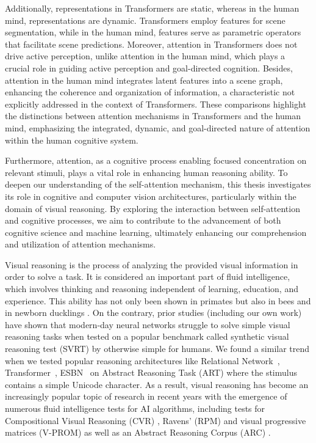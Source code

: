 Additionally, representations in Transformers are static, whereas in the human mind, representations are dynamic. Transformers employ features for scene segmentation, while in the human mind, features serve as parametric operators that facilitate scene predictions. Moreover, attention in Transformers does not drive active perception, unlike attention in the human mind, which plays a crucial role in guiding active perception and goal-directed cognition. Besides, attention in the human mind integrates latent features into a scene graph, enhancing the coherence and organization of information, a characteristic not explicitly addressed in the context of Transformers. These comparisons highlight the distinctions between attention mechanisms in Transformers and the human mind, emphasizing the integrated, dynamic, and goal-directed nature of attention within the human cognitive system.

Furthermore, attention, as a cognitive process enabling focused concentration on relevant stimuli, plays a vital role in enhancing human reasoning ability. To deepen our understanding of the self-attention mechanism, this thesis investigates its role in cognitive and computer vision architectures, particularly within the domain of visual reasoning. By exploring the interaction between self-attention and cognitive processes, we aim to contribute to the advancement of both cognitive science and machine learning, ultimately enhancing our comprehension and utilization of attention mechanisms.

Visual reasoning is the process of analyzing the provided visual information in order to solve a task. It is considered an important part of fluid intelligence, which involves thinking and reasoning independent of learning, education, and experience. This ability has not only been shown in primates \citep{gentner2021learning} but also in bees \citep{giurfa2001concepts} and in newborn ducklings \citep{martinho2016ducklings}. On the contrary, prior studies \citep{Puebla2021.04.06.438551,kim2018not,ricci37same,messina2021solving} (including our own work) have shown that modern-day neural networks struggle to solve simple visual reasoning tasks when tested on a popular benchmark called synthetic visual reasoning test (SVRT) by \citet{fleuret2011comparing} otherwise simple for humans. We found a similar trend when we tested popular reasoning architectures like Relational Network~\citep{santoro2017simple}, Transformer~\citep{vaswani2017attention}, ESBN~\citep{Webb2021EmergentST} on Abstract Reasoning Task (ART) where the stimulus contains a simple Unicode character. As a result, visual reasoning has become an increasingly popular topic of research in recent years with the emergence of numerous fluid intelligence tests for AI algorithms, including tests for Compositional Visual Reasoning (CVR)  \citep{zerroug2022benchmark}, Ravens' (RPM) \citep{barrett2018measuring,zhang2019raven} and visual progressive matrices (V-PROM) \citep{barrett2018measuring,teney2020v} as well as an Abstract Reasoning Corpus (ARC) \citep{chollet2019measure}. 

